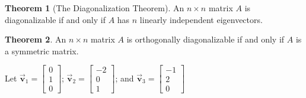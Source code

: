 \documentclass[letter,11pt]{article}
\theoremstyle{definition}
\newtheorem{theorem}{Theorem}[section]
\newcommand{\vvec}{\vec{\boldsymbol{v}}}
\begin{document}
\newpage
\begin{tcolorbox}[boxrule=1mm,enhanced jigsaw, breakable,before=\hfill,after=\hfill,adjusted title={Problem 4 solutions}]
    \begin{theorem}[The Diagonalization Theorem]
        An $n\times n$ matrix $A$ is diagonalizable if and only if $A$ has $n$ linearly independent eigenvectors.
    \end{theorem}
    \begin{theorem}
        An $n\times n$ matrix $A$ is orthogonally diagonalizable if and only if $A$ is a symmetric matrix.
    \end{theorem}
    \tcblower

    Let $\vvec_{1} = \begin{bmatrix}0\\ 1\\ 0 \end{bmatrix}$; $\vvec_{2} = \begin{bmatrix}-2\\ 0\\ 1 \end{bmatrix}$; and $\vvec_{3} = \begin{bmatrix}-1\\ 2\\ 0 \end{bmatrix}$


\end{tcolorbox}
\end{document}
